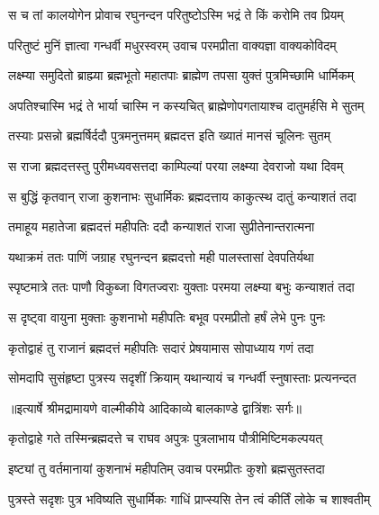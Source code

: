 \twolineshloka
{स च तां कालयोगेन प्रोवाच रघुनन्दन}
{परितुष्टोऽस्मि भद्रं ते किं करोमि तव प्रियम्} %

\twolineshloka
{परितुष्टं मुनिं ज्ञात्वा गन्धर्वी मधुरस्वरम्}
{उवाच परमप्रीता वाक्यज्ञा वाक्यकोविदम्} %

\twolineshloka
{लक्ष्म्या समुदितो ब्राह्म्या ब्रह्मभूतो महातपाः}
{ब्राह्मेण तपसा युक्तं पुत्रमिच्छामि धार्मिकम्} %

\twolineshloka
{अपतिश्चास्मि भद्रं ते भार्या चास्मि न कस्यचित्}
{ब्राह्मेणोपगतायाश्च दातुमर्हसि मे सुतम्} %

\twolineshloka
{तस्याः प्रसन्नो ब्रह्मर्षिर्ददौ पुत्रमनुत्तमम्}
{ब्रह्मदत्त इति ख्यातं मानसं चूलिनः सुतम्} %

\twolineshloka
{स राजा ब्रह्मदत्तस्तु पुरीमध्यवसत्तदा}
{काम्पिल्यां परया लक्ष्म्या देवराजो यथा दिवम्} %

\twolineshloka
{स बुद्धिं कृतवान् राजा कुशनाभः सुधार्मिकः}
{ब्रह्मदत्ताय काकुत्स्थ दातुं कन्याशतं तदा} %

\twolineshloka
{तमाहूय महातेजा ब्रह्मदत्तं महीपतिः}
{ददौ कन्याशतं राजा सुप्रीतेनान्तरात्मना} %

\twolineshloka
{यथाक्रमं ततः पाणिं जग्राह रघुनन्दन}
{ब्रह्मदत्तो मही पालस्तासां देवपतिर्यथा} %

\twolineshloka
{स्पृष्टमात्रे ततः पाणौ विकुब्जा विगतज्वराः}
{युक्ताः परमया लक्ष्म्या बभुः कन्याशतं तदा} %

\twolineshloka
{स दृष्ट्वा वायुना मुक्ताः कुशनाभो महीपतिः}
{बभूव परमप्रीतो हर्षं लेभे पुनः पुनः} %

\twolineshloka
{कृतोद्वाहं तु राजानं ब्रह्मदत्तं महीपतिः}
{सदारं प्रेषयामास सोपाध्याय गणं तदा} %

\twolineshloka
{सोमदापि सुसंहृष्टा पुत्रस्य सदृशीं क्रियाम्}
{यथान्यायं च गन्धर्वी स्नुषास्ताः प्रत्यनन्दत} %


{॥इत्यार्षे श्रीमद्रामायणे वाल्मीकीये आदिकाव्ये बालकाण्डे द्वात्रिंशः सर्गः॥}


\twolineshloka
{कृतोद्वाहे गते तस्मिन्ब्रह्मदत्ते च राघव}
{अपुत्रः पुत्रलाभाय पौत्रीमिष्टिमकल्पयत्} %

\twolineshloka
{इष्ट्यां तु वर्तमानायां कुशनाभं महीपतिम्}
{उवाच परमप्रीतः कुशो ब्रह्मसुतस्तदा} %

\twolineshloka
{पुत्रस्ते सदृशः पुत्र भविष्यति सुधार्मिकः}
{गाधिं प्राप्स्यसि तेन त्वं कीर्तिं लोके च शाश्वतीम्} %


